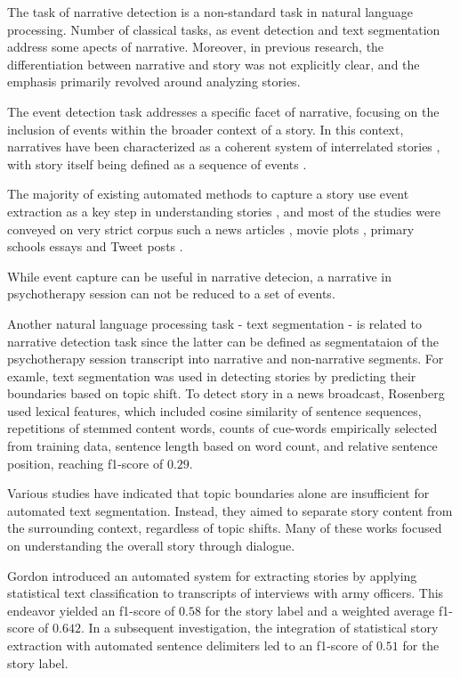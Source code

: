 \documentclass[preprint,12pt]{elsarticle}
\begin{document}
The task of narrative detection is a non-standard task in natural language processing. Number of classical tasks, as event detection and text segmentation address some apects of narrative. Moreover, in previous research, the differentiation between narrative and story was not explicitly clear, and the emphasis primarily revolved around analyzing stories. 

The event detection task addresses a specific facet of narrative, focusing on the inclusion of events within the broader context of a story. In this context, narratives have been characterized as a coherent system of interrelated stories \cite{halverson2011master}, with story itself being defined as a sequence of events \cite{wake2013narrative}. 

The majority of existing automated methods to capture a story use event extraction as a key step in understanding stories \cite{norambuena2023survey}, and most of the studies were conveyed on very strict corpus such a news articles \cite{levi2022detecting, yu2021automatic, ge2010story, chambers2008unsupervised}, movie plots \cite{martin2018event}, primary schools essays \cite{halpin2006event} and Tweet posts \cite{wang2019open}. 

While event capture can be useful in narrative detecion, a narrative in psychotherapy session can not be reduced to a set of events.

Another natural language processing task - text segmentation - is related to narrative detection task since the latter can be defined as segmentataion of the psychotherapy session transcript into narrative and non-narrative segments. For examle, text segmentation was used in detecting stories by predicting their boundaries based on topic shift. To detect story in a news broadcast, Rosenberg \cite{rosenberg2006story} used lexical features, which included cosine similarity of sentence sequences, repetitions of stemmed content words, counts of cue-words empirically selected from training data, sentence length based on word count, and relative sentence position, reaching f1-score of $0.29$.

Various studies \cite{gordon2007automated,swansonfirst,engin2021hidden} have indicated that topic boundaries alone are insufficient for automated text segmentation. Instead, they aimed to separate story content from the surrounding context, regardless of topic shifts. Many of these works focused on understanding the overall story through dialogue.

Gordon \cite{gordon2005automated} introduced an automated system for extracting stories by applying statistical text classification to transcripts of interviews with army officers. This endeavor yielded an f1-score of $0.58$ for the story label and a weighted average f1-score of $0.642$. In a subsequent investigation, the integration of statistical story extraction with automated sentence delimiters led to an f1-score of $0.51$ for the story label\cite{gordon2007automated}.
\end{document}
